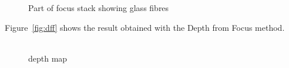 \documentclass[12pt,a4paper,oneside,openright]{book}
\newcommand{\fig}[1]{Figure~\ref{fig:#1}}
\begin{document}
\begin{CJK}{UTF8}{}
\begin{figure}[htbp]
\begin{center}
    \caption{Part of focus stack showing glass fibres\label{fig:stack}}
  \end{center}
\end{figure}
\fig{dff} shows the result obtained with the Depth from Focus method.
\begin{figure}[htbp]
  \begin{center}
    \begin{minipage}[c]{.46\textwidth}
      \begin{center}
        \\
        depth map
      \end{center}

\end{minipage}
\end{center}
\end{figure}
\end{CJK}
\end{document}
